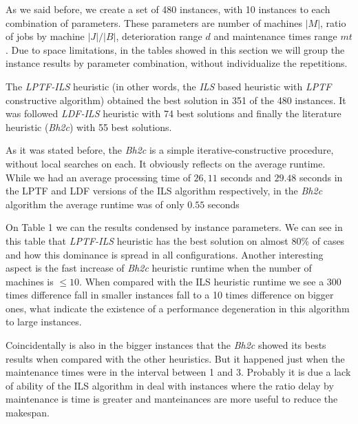 \documentclass[a4paper,11pt]{article}
\begin{document}
As we said before, we create a set of 480 instances, with 10 instances to each combination of parameters. These parameters are number of machines $|M|$, ratio of jobs by machine $|J|/|B|$, deterioration range $d$ and maintenance times range $mt$. Due to space limitations, in the tables showed in this section we will group the instance results by parameter combination, without individualize the repetitions. 

The \emph{LPTF-ILS} heuristic (in other words, the \emph{ILS} based heuristic with \emph{LPTF} constructive algorithm) obtained the best solution in 351 of the 480 instances. It was followed \emph{LDF-ILS} heuristic with 74 best solutions and finally the literature heuristic (\emph{Bh2c}) with 55 best solutions. 

As it was stated before, the \emph{Bh2c} is a simple iterative-constructive procedure, without local searches on each. It obviously reflects on the average runtime. While we had an average processing time of $26,11$ seconds and $29.48$ seconds in the LPTF and LDF versions of the ILS algorithm respectively, in the \emph{Bh2c} algorithm the average runtime was of only $0.55$ seconds

On Table 1 we can the results condensed by instance parameters. We can see in this table that \emph{LPTF-ILS} heuristic has the best solution on almost $80\%$ of cases and how this dominance is spread in all configurations. Another interesting aspect is the fast increase of \emph{Bh2c} heuristic runtime when the number of machines is $\leq 10$. When compared with the ILS heuristic runtime we see a 300 times difference fall in smaller instances fall to a 10 times difference on bigger ones, what indicate the existence of a performance degeneration in this algorithm to large instances.

Coincidentally is also in the bigger instances that the \emph{Bh2c} showed its bests  results when compared with the other heuristics. But it happened just when the maintenance times were in the interval between 1 and 3. Probably it is due a lack of ability of the ILS algorithm in deal with instances where the ratio delay by maintenance  is time is greater and manteinances are more useful to reduce the makespan.  
\end{document}
